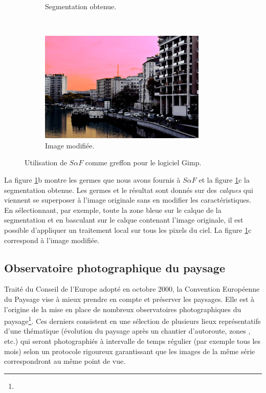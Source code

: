 \begin{figure}[htb]
\begin{subfigure}{0.45\textwidth}
\caption{Segmentation obtenue. }
 \end{subfigure}
 \\
 \begin{subfigure}{0.6\textwidth}	
\includegraphics[width=\textwidth]{images/evaluation/img_manipulation_res}
\caption{Image modifiée.}
 \end{subfigure}
\caption{Utilisation de $S \alpha F$ comme greffon pour le logiciel Gimp.}
	\label{fig:eval:saf-in-gimp}
\end{figure} 


La figure \ref{fig:eval:saf-in-gimp}b montre les germes que nous avons fournis à $S \alpha F$ et la figure \ref{fig:eval:saf-in-gimp}c la segmentation obtenue. Les germes et le résultat sont donnés sur des \emph{calques} qui viennent se superposer à l'image originale sans en modifier les caractéristiques. En sélectionnant, par exemple, toute la zone bleue sur le calque de la segmentation et en basculant sur le calque contenant l'image originale, il est  possible d'appliquer un traitement local sur tous les pixels du ciel. La figure \ref{fig:eval:saf-in-gimp}c correspond à l'image modifiée.

\subsection{Observatoire photographique du paysage}
\label{subsec:eval:opp}

Traité du Conseil de l'Europe adopté en octobre 2000, la Convention Européenne du Paysage vise à mieux prendre en compte et préserver les paysages. Elle est à l'origine de la mise en place de nombreux observatoires photographiques du paysage\footnote{}. Ces derniers consistent en une sélection de plusieurs lieux représentatifs d'une thématique (évolution du paysage après un chantier d'autoroute, zones , etc.) qui seront photographiés à intervalle de temps régulier (par exemple tous les mois) selon un protocole rigoureux garantissant que les images de la même série correspondront au même point de vue.


